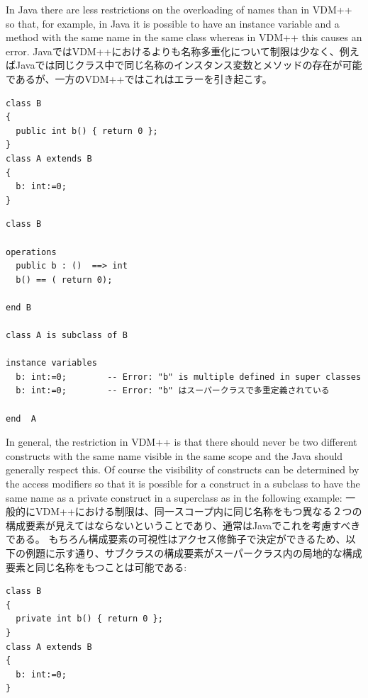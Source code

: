 \documentclass[\pformat,12pt]{jarticle}
\begin{document}
In Java there are less restrictions on the overloading of names than
in VDM++ so that, for example, in Java it is possible to have an instance
variable and a method with the same name in the same class  whereas in
VDM++ this causes an error.  
JavaではVDM++におけるよりも名称多重化について制限は少なく、例えばJavaでは同じクラス中で同じ名称のインスタンス変数とメソッドの存在が可能であるが、一方のVDM++ではこれはエラーを引き起こす。

\begin{small}
\begin{verbatim}
class B
{
  public int b() { return 0 };
}
class A extends B
{ 
  b: int:=0;
}
\end{verbatim}
\end{small}

\begin{small}
\begin{verbatim}
class B

operations
  public b : ()  ==> int
  b() == ( return 0);

end B

class A is subclass of B

instance variables
  b: int:=0;        -- Error: "b" is multiple defined in super classes
  b: int:=0;        -- Error: "b" はスーパークラスで多重定義されている

end  A
\end{verbatim}
\end{small}

In general, the restriction in VDM++ is that there should never be two
different constructs with the same name visible in the same scope and
the Java should generally respect this. Of course the visibility of
constructs can be determined by the access modifiers so that it is
possible for a construct in a subclass to have the same name as a
private construct in a superclass as in the following example:
一般的にVDM++における制限は、同一スコープ内に同じ名称をもつ異なる２つの構成要素が見えてはならないということであり、通常はJavaでこれを考慮すべきである。 
もちろん構成要素の可視性はアクセス修飾子で決定ができるため、以下の例題に示す通り、サブクラスの構成要素がスーパークラス内の局地的な構成要素と同じ名称をもつことは可能である:

\begin{small}
\begin{verbatim}
class B
{
  private int b() { return 0 };
}
class A extends B
{ 
  b: int:=0;
}
\end{verbatim}
\end{small}
\end{document}
